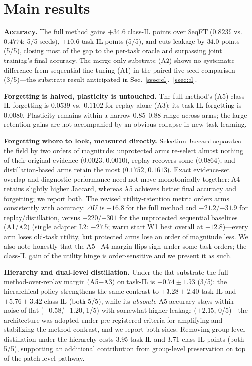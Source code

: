 \documentclass{article}
\begin{document}
\section{Main results}
\label{sec:results}
\textbf{Accuracy.} The full method gains $+34.6$ class-IL points over SeqFT ($0.8239$ vs.\ $0.4774$; 5/5 seeds), $+10.6$ task-IL points (5/5), and cuts leakage by $34.0$ points (5/5), closing most of the gap to the per-task oracle and surpassing joint training's final accuracy. The merge-only substrate (A2) shows no systematic difference from sequential fine-tuning (A1) in the paired five-seed comparison (3/5)---the substrate result anticipated in Sec.~\ref{ssec:cl}.~\ref{ssec:cl}.

\textbf{Forgetting is halved, plasticity is untouched.} The full method's (A5) class-IL forgetting is $0.0539$ vs.\ $0.1102$ for replay alone (A3); its task-IL forgetting is $0.0080$. Plasticity remains within a narrow $0.85$--$0.88$ range across arms; the large retention gains are not accompanied by an obvious collapse in new-task learning.

\textbf{Forgetting where to look, measured directly.} Selection Jaccard separates the field by two orders of magnitude: unprotected arms re-select almost nothing of their original evidence ($0.0023$, $0.0010$), replay recovers some ($0.0864$), and distillation-based arms retain the most ($0.1752$, $0.1613$). Exact evidence-set overlap and diagnostic performance need not move monotonically together: A4 retains slightly higher Jaccard, whereas A5 achieves better final accuracy and forgetting; we report both. The revised utility-retention metric orders arms consistently with accuracy: $\Delta U$ is $-16.8$ for the full method and $-21.2$/$-31.9$ for replay/distillation, versus $-220$/$-301$ for the unprotected sequential baselines (A1/A2) (single adapter L2: $-27.5$; warm start W1 best overall at $-12.8$)---every arm loses old-task utility, but protected arms lose an order of magnitude less. We also note honestly that the A5$-$A4 margin flips sign under some task orders; the class-IL gain of the utility hinge is order-sensitive and we present it as such.

\textbf{Hierarchy and dual-level distillation.} Under the flat substrate the full-method-over-replay margin (A5$-$A3) on task-IL is $+0.74{\pm}1.93$ (3/5); the hierarchical policy strengthens the same contrast to $+3.28{\pm}2.40$ task-IL and $+5.76{\pm}3.42$ class-IL (both 5/5), while its \emph{absolute} A5 accuracy stays within noise of flat ($-0.58$/$-1.20$, 1/5) with somewhat higher leakage ($+2.15$, 0/5)---the architecture was adopted under pre-registered criteria for amplifying and stabilizing the method contrast, and we report both sides. Removing group-level distillation under the hierarchy costs $3.95$ task-IL and $3.71$ class-IL points (both 5/5), supporting an additional contribution from group-level preservation on top of the patch-level pathway.
\end{document}
